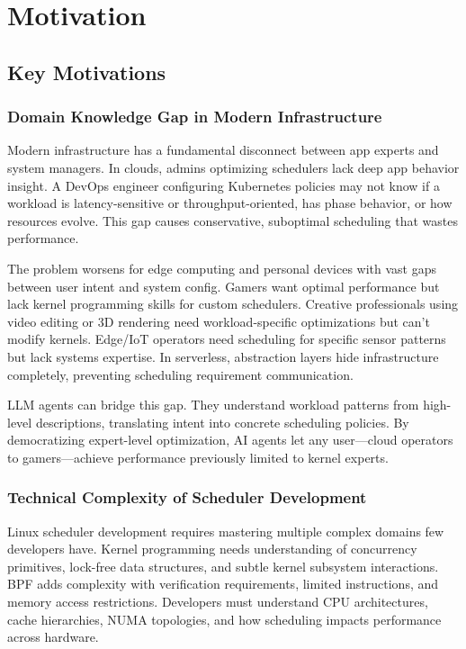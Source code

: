 \section{Motivation}

\subsection{Key Motivations}

\subsubsection{Domain Knowledge Gap in Modern Infrastructure}

Modern infrastructure has a fundamental disconnect between app experts and system managers. In clouds, admins optimizing schedulers lack deep app behavior insight. A DevOps engineer configuring Kubernetes policies may not know if a workload is latency-sensitive or throughput-oriented, has phase behavior, or how resources evolve. This gap causes conservative, suboptimal scheduling that wastes performance.

The problem worsens for edge computing and personal devices with vast gaps between user intent and system config. Gamers want optimal performance but lack kernel programming skills for custom schedulers. Creative professionals using video editing or 3D rendering need workload-specific optimizations but can't modify kernels. Edge/IoT operators need scheduling for specific sensor patterns but lack systems expertise. In serverless, abstraction layers hide infrastructure completely, preventing scheduling requirement communication.

LLM agents can bridge this gap. They understand workload patterns from high-level descriptions, translating intent into concrete scheduling policies. By democratizing expert-level optimization, AI agents let any user—cloud operators to gamers—achieve performance previously limited to kernel experts.

\subsubsection{Technical Complexity of Scheduler Development}

Linux scheduler development requires mastering multiple complex domains few developers have. Kernel programming needs understanding of concurrency primitives, lock-free data structures, and subtle kernel subsystem interactions. BPF adds complexity with verification requirements, limited instructions, and memory access restrictions. Developers must understand CPU architectures, cache hierarchies, NUMA topologies, and how scheduling impacts performance across hardware.

